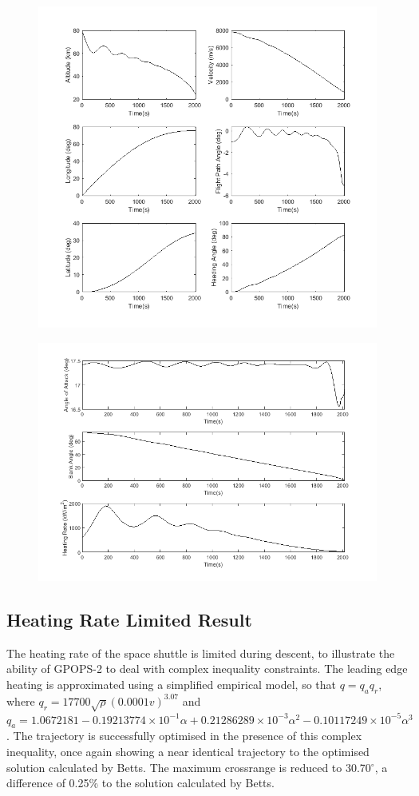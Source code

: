 \begin{figure}[H]
\centering
\includegraphics[width=0.7\linewidth]{figures/A1_uncertainty-analysis/SpaceShuttleNoq1}
\caption{}
\label{fig:SpaceShuttleNoq1}
\end{figure}
\begin{figure}[H]
\centering
\includegraphics[width=0.7\linewidth]{figures/A1_uncertainty-analysis/SpaceShuttleNoq2}
\caption{}
\label{fig:SpaceShuttleNoq2}
\end{figure}


\subsection{Heating Rate Limited Result}
The heating rate of the space shuttle is limited during descent, to illustrate the ability of GPOPS-2 to deal with complex inequality constraints. The leading edge heating is approximated using a simplified empirical model, so that $q = q_aq_r$, where $q_r = 17700\sqrt{\rho}(0.0001v)^{3.07}$ and $q_a = 1.0672181 -0.19213774\times10^{-1}
\alpha + 0.21286289\times10^{-3}\alpha^2 -0.10117249\times10^{-5}\alpha^3$. The trajectory is successfully optimised in the presence of this complex inequality, once again showing a near identical trajectory to the optimised solution calculated by Betts\cite{Betts2009}. The maximum crossrange is reduced to 30.70$^\circ$, a difference of 0.25\% to the solution calculated by Betts\cite{Betts2009}.

